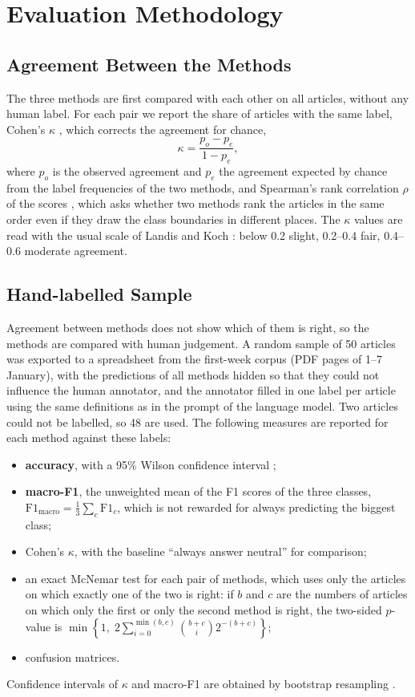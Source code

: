 \section{Evaluation Methodology}
\label{sec:eval}

\subsection{Agreement Between the Methods}
The three methods are first compared with each other on all articles, without any human label. For each pair we report the share of articles with the same label, Cohen's $\kappa$ \cite{cohen1960}, which corrects the agreement for chance,
\begin{equation}
\kappa = \frac{p_o - p_e}{1 - p_e},
\end{equation}
where $p_o$ is the observed agreement and $p_e$ the agreement expected by chance from the label frequencies of the two methods, and Spearman's rank correlation $\rho$ of the scores \cite{spearman1904}, which asks whether two methods rank the articles in the same order even if they draw the class boundaries in different places. The $\kappa$ values are read with the usual scale of Landis and Koch \cite{landis1977}: below 0.2 slight, 0.2--0.4 fair, 0.4--0.6 moderate agreement.

\subsection{Hand-labelled Sample}
Agreement between methods does not show which of them is right, so the methods are compared with human judgement. A random sample of 50 articles was exported to a spreadsheet from the first-week corpus (PDF pages of 1--7 January), with the predictions of all methods hidden so that they could not influence the human annotator, and the annotator filled in one label per article using the same definitions as in the prompt of the language model. Two articles could not be labelled, so 48 are used. The following measures are reported for each method against these labels:
\begin{itemize}
\item \textbf{accuracy}, with a 95\% Wilson confidence interval \cite{wilson1927};
\item \textbf{macro-F1}, the unweighted mean of the F1 scores of the three classes, $\mathrm{F1}_{\mathrm{macro}} = \frac{1}{3}\sum_{c} \mathrm{F1}_c$, which is not rewarded for always predicting the biggest class;
\item Cohen's $\kappa$, with the baseline ``always answer neutral'' for comparison;
\item an exact McNemar test \cite{mcnemar1947} for each pair of methods, which uses only the articles on which exactly one of the two is right: if $b$ and $c$ are the numbers of articles on which only the first or only the second method is right, the two-sided $p$-value is $\min\left\{1,\; 2\sum_{i=0}^{\min(b,c)}\binom{b+c}{i}2^{-(b+c)}\right\}$;
\item confusion matrices.
\end{itemize}
Confidence intervals of $\kappa$ and macro-F1 are obtained by bootstrap resampling \cite{efron1979}.

